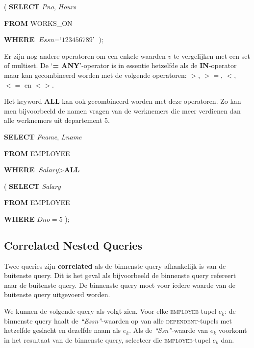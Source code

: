 \hspace{40mm}
( \textbf{SELECT} \textit{Pno}, \textit{Hours}

\hspace{40mm}
\phantom{(} \textbf{FROM} WORKS\_ON

\hspace{40mm}
\phantom{(} \textbf{WHERE} $\textit{Essn} = \textit{`123456789'}$ );
\vspace{3mm}

\noindent Er zijn nog andere operatoren om een enkele waarden $v$ te vergelijken met een set of multiset. De `\textbf{= ANY}'-operator is in essentie hetzelfde als de \textbf{IN}-operator maar kan gecombineerd worden met de volgende operatoren: $>$, $>=$, $<$, $<=$ en $<>$.

Het keyword \textbf{ALL} kan ook gecombineerd worden met deze operatoren. Zo kan men bijvoorbeeld de namen vragen van de werknemers die meer verdienen dan alle werknemers uit departement 5.

\vspace{1mm}\hspace{10mm}
\textbf{SELECT} \textit{Fname}, \textit{Lname}

\hspace{10mm}
\textbf{FROM} EMPLOYEE

\hspace{10mm}
\textbf{WHERE} $\textit{Salary} > \textbf{ALL}$

\hspace{40mm}
( \textbf{SELECT} \textit{Salary}

\hspace{40mm}
\phantom{(} \textbf{FROM} EMPLOYEE

\hspace{40mm}
\phantom{(} \textbf{WHERE} $\textit{Dno} = 5$ );


\subsection{Correlated Nested Queries}
Twee queries zijn \textbf{correlated} als de binnenste query afhankelijk is van de buitenste query. Dit is het geval als bijvoorbeeld de binnenste query refereert naar de buitenste query. De binnenste query moet voor iedere waarde van de buitenste query uitgevoerd worden.

We kunnen de volgende query als volgt zien. Voor elke \textsc{employee}-tupel $e_k$: de binnenste query haalt de \textit{``Essn''}-waarden op van alle \textsc{dependent}-tupels met hetzelfde geslacht en dezelfde naam als $e_k$. Als de \textit{``Ssn''}-waarde van $e_k$ voorkomt in het resultaat van de binnenste query, selecteer die \textsc{employee}-tupel $e_k$ dan.

